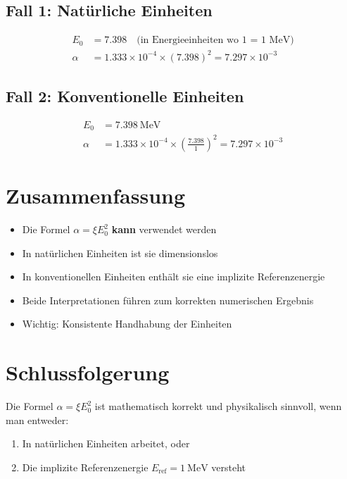 \documentclass[12pt, a4paper]{article}
\begin{document}
\subsection*{Fall 1: Natürliche Einheiten}
\begin{align*}
	E_0 &= 7.398 \quad \text{(in Energieeinheiten wo 1 = 1 MeV)} \\
	\alpha &= 1.333 \times 10^{-4} \times (7.398)^2 = 7.297 \times 10^{-3}
\end{align*}

\subsection*{Fall 2: Konventionelle Einheiten}
\begin{align*}
	E_0 &= \SI{7.398}{\MeV} \\
	\alpha &= 1.333 \times 10^{-4} \times \left(\frac{7.398}{1}\right)^2 = 7.297 \times 10^{-3}
\end{align*}

\section*{Zusammenfassung}

\begin{itemize}
	\item Die Formel $\alpha = \xi E_0^2$ \textbf{kann} verwendet werden
	\item In natürlichen Einheiten ist sie dimensionslos
	\item In konventionellen Einheiten enthält sie eine implizite Referenzenergie
	\item Beide Interpretationen führen zum korrekten numerischen Ergebnis
	\item Wichtig: Konsistente Handhabung der Einheiten
\end{itemize}

\section*{Schlussfolgerung}

Die Formel $\alpha = \xi E_0^2$ ist mathematisch korrekt und physikalisch sinnvoll, wenn man entweder:
\begin{enumerate}
	\item In natürlichen Einheiten arbeitet, oder
	\item Die implizite Referenzenergie $E_{\text{ref}} = \SI{1}{\MeV}$ versteht
\end{enumerate}
\end{document}
